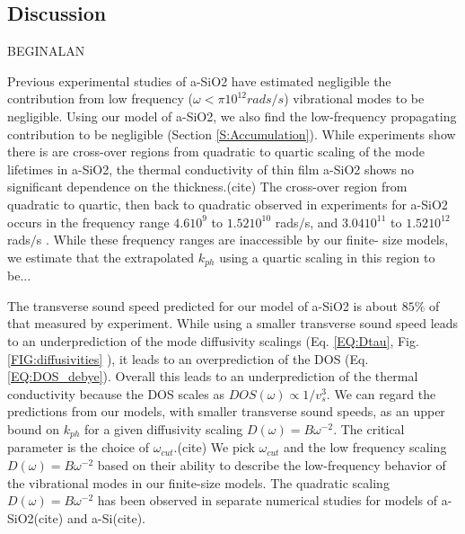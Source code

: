 \documentclass[aps,prb,onecolumn,preprint,superscriptaddress,footinbib,amsmath,amssymb,floatfix]{revtex4}
\begin{document}

\subsection{\label{S:Discussion}Discussion}

BEGINALAN

Previous experimental studies of a-SiO2 have estimated negligible 
the contribution from 
low frequency ($\omega<\pi 10^12 rads/s$)\cite{love_estimate_1990} 
vibrational modes to be negligible. Using our model of a-SiO2, we also 
find the 
low-frequency propagating contribution to be negligible 
(Section \ref{S:Accumulation}). 
While experiments show there is are 
cross-over regions from quadratic to quartic scaling of the mode 
lifetimes in a-SiO2, the thermal conductivity of thin film a-SiO2 shows 
no significant dependence on the thickness.(cite) 
The cross-over 
region from quadratic to quartic, then back to quadratic 
observed in experiments for  
a-SiO2 occurs in the frequency range $4.6 10^9$ to 
$1.52 10^{10}$ rads$/$s,\cite{masciovecchio_evidence_2006} 
and $3.04 10^11$ to 
$1.52 10^{12}$ rads$/$s
\cite{baldi_emergence_2013}. 
While these frequency ranges are inaccessible by our finite-
size models, we estimate that the extrapolated $k_{ph}$ using a quartic 
scaling in this region to be... 

The transverse sound speed predicted for our model of 
a-SiO2 is about $85\%$ of that measured by experiment.\cite{liu_high_2009}  
While using a smaller transverse sound speed 
leads to an underprediction of the 
mode diffusivity scalings (Eq. \eqref{EQ:Dtau},
Fig. \ref{FIG:diffusivities} ), it leads to an 
overprediction of the DOS (Eq. \eqref{EQ:DOS_debye}). 
Overall this leads to an underprediction 
of the thermal conductivity because the DOS scales as 
$DOS(\omega)\propto 1/v^3_{s}$. We can regard the predictions from 
our models, with smaller transverse sound speeds, 
as an upper bound on $k_{ph}$ for a given diffusivity scaling 
$D(\omega) = B\omega^{-2}$. 
The critical parameter is the choice of $\omega_{cut}$.(cite) 
We pick 
$\omega_{cut}$ and the low frequency scaling $D(\omega) = B\omega^{-2}$ 
based on their ability to describe the low-frequency behavior 
of the vibrational modes in our finite-size models. The quadratic scaling 
$D(\omega) = B\omega^{-2}$ has been observed in separate numerical studies 
for models of a-SiO2(cite) and a-Si(cite). 
\end{document}
